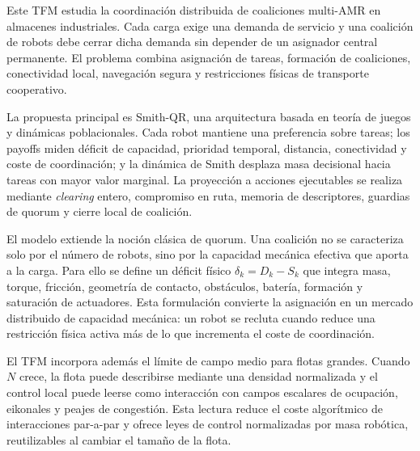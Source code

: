 \documentclass[12pt,a4paper]{article}
\begin{document}
\hypersetup{pageanchor=false}
\makeviucover
\hypersetup{pageanchor=true}


\thispagestyle{frontmatter}
\null
\clearpage

\begin{viuabstract}
Este TFM estudia la coordinación distribuida de coaliciones multi-AMR en almacenes
industriales. Cada carga exige una demanda de servicio y una coalición de robots debe
cerrar dicha demanda sin depender de un asignador central permanente. El problema combina
asignación de tareas, formación de coaliciones, conectividad local, navegación segura y
restricciones físicas de transporte cooperativo.

La propuesta principal es Smith-QR, una arquitectura basada en teoría de juegos y
dinámicas poblacionales. Cada robot mantiene una preferencia sobre tareas; los payoffs
miden déficit de capacidad, prioridad temporal, distancia, conectividad y coste de
coordinación; y la dinámica de Smith desplaza masa decisional hacia tareas con mayor
valor marginal. La proyección a acciones ejecutables se realiza mediante \emph{clearing}
entero, compromiso en ruta, memoria de descriptores, guardias de quorum y cierre local de
coalición.

El modelo extiende la noción clásica de quorum. Una coalición no se caracteriza solo por
el número de robots, sino por la capacidad mecánica efectiva que aporta a la carga. Para
ello se define un déficit físico $\delta_k=D_k-S_k$ que integra masa, torque, fricción,
geometría de contacto, obstáculos, batería, formación y saturación de actuadores. Esta
formulación convierte la asignación en un mercado distribuido de capacidad mecánica: un
robot se recluta cuando reduce una restricción física activa más de lo que incrementa el
coste de coordinación.

El TFM incorpora además el límite de campo medio para flotas grandes. Cuando $N$ crece,
la flota puede describirse mediante una densidad normalizada y el control local puede
leerse como interacción con campos escalares de ocupación, eikonales y peajes de
congestión. Esta lectura reduce el coste algorítmico de interacciones par-a-par y ofrece
leyes de control normalizadas por masa robótica, reutilizables al cambiar el tamaño de la
flota.


\end{viuabstract}
\end{document}
